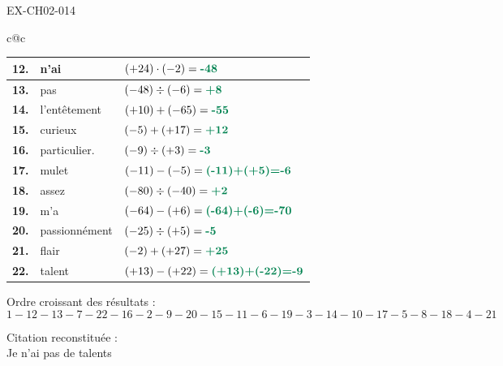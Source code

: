 \documentclass[12pt, a4paper]{article}
\begin{document}
\begin{solution}{EX-CH02-014}
\begin{center}
\begin{tabular}{c@{\hspace{8mm}}c}
  \begin{tabular}{|>{\centering\arraybackslash}p{6mm}|p{2.5cm}|p{4.0cm}|}
    \hline
    \cellcolor{gray!40}\textbf{12.} &n'ai& $(+24)\cdot(-2)=\rc{-48}$             \\ \hline
    \cellcolor{gray!40}\textbf{13.} &pas& $(-48)\div(-6)=\rc{+8}$               \\ \hline
    \cellcolor{gray!40}\textbf{14.} &l'entêtement& $(+10)+(-65)=\rc{-55}$                \\ \hline
    \cellcolor{gray!40}\textbf{15.} &curieux& $(-5)+(+17)=\rc{+12}$                 \\ \hline
    \cellcolor{gray!40}\textbf{16.} &particulier.& $(-9)\div(+3)=\rc{-3}$                \\ \hline
    \cellcolor{gray!40}\textbf{17.} &mulet& $(-11)-(-5)=\rc{(-11)+(+5)=-6}$       \\ \hline
    \cellcolor{gray!40}\textbf{18.} &assez& $(-80)\div(-40)=\rc{+2}$              \\ \hline
    \cellcolor{gray!40}\textbf{19.} &m'a& $(-64)-(+6)=\rc{(-64)+(-6)=-70}$      \\ \hline
    \cellcolor{gray!40}\textbf{20.} &passionnément& $(-25)\div(+5)=\rc{-5}$               \\ \hline
    \cellcolor{gray!40}\textbf{21.} &flair& $(-2)+(+27)=\rc{+25}$                 \\ \hline
    \cellcolor{gray!40}\textbf{22.} &talent& $(+13)-(+22)=\rc{(+13)+(-22)=-9}$     \\ \hline
  \end{tabular}

\end{tabular}
\end{center}

\bigskip
\noindent Ordre croissant des résultats :
\[
  1 - 12 - 13 - 7 - 22 - 16 - 2 - 9 - 20 - 15 - 11 - 6 - 19 - 3 - 14 - 10 - 17 - 5 - 8 - 18 - 4 - 21
\]

\bigskip
\noindent Citation reconstituée :\\
Je n'ai pas de talents 


\end{solution}
\end{document}
